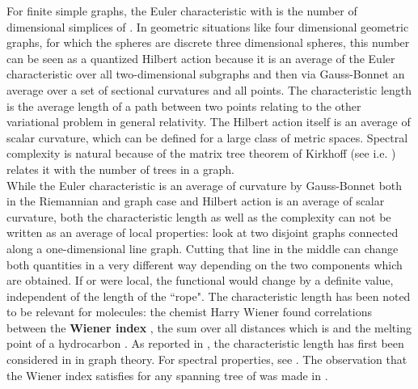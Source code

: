 \documentclass[12pt]{amsart}
\theoremstyle{definition}
\begin{document}
For finite simple graphs, the Euler characteristic  
with  is the number of  dimensional simplices  of . In geometric
situations like four dimensional geometric graphs, for which the spheres are discrete three dimensional 
spheres, this number can be seen as a quantized Hilbert action \cite{eveneuler} because it is an 
average of the Euler characteristic over all two-dimensional subgraphs and then via Gauss-Bonnet 
an average over a set of sectional curvatures and all points. 
The characteristic length is the average length of a path between two points relating 
to the other variational problem in general relativity. 
The Hilbert action itself is an average of scalar curvature, which can be 
defined for a large class of metric spaces. Spectral complexity
is natural because of the matrix tree theorem of Kirkhoff (see i.e. \cite{Biggs} )
relates it with the number of trees in a graph.  \\

While the Euler characteristic is an average of curvature by Gauss-Bonnet both in the Riemannian 
and graph case \cite{cherngaussbonnet} and Hilbert action is an average of scalar curvature, 
both the characteristic length  as well as the complexity  can not be written 
as an average of local properties: look at two disjoint graphs connected along a 
one-dimensional line graph. Cutting that line in the middle can change both quantities in a very different way 
depending on the two components which are obtained. If 
or  were local, the functional would change by a definite value, independent of the length of the ``rope".
The characteristic length has been noted to be relevant for molecules: the chemist Harry Wiener found
correlations between the {\bf Wiener index} , the sum over all distances which is 
 and the melting point of a hydrocarbon . As reported in 
\cite{GoddardOellermann}, the characteristic length has first been considered in 
\cite{DoyleGraver1} in graph theory. For spectral properties, see \cite{Miegham}. 
The observation that the Wiener index satisfies  
for any spanning tree  of  was made in \cite{Schmuck}.  \\
\end{document}
